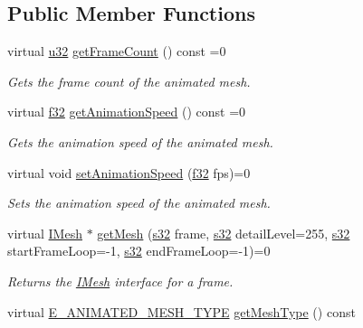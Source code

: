 \subsection*{Public Member Functions}
\begin{DoxyCompactItemize}
\item 
virtual \hyperlink{namespaceirr_a0416a53257075833e7002efd0a18e804}{u32} \hyperlink{classirr_1_1scene_1_1IAnimatedMesh_a2ec99aba081e9f37802e8ea9cd65629b}{get\+Frame\+Count} () const =0
\begin{DoxyCompactList}\small\item\em Gets the frame count of the animated mesh. \end{DoxyCompactList}\item 
virtual \hyperlink{namespaceirr_a0277be98d67dc26ff93b1a6a1d086b07}{f32} \hyperlink{classirr_1_1scene_1_1IAnimatedMesh_acb4249295319c8240d5bedc167417435}{get\+Animation\+Speed} () const =0
\begin{DoxyCompactList}\small\item\em Gets the animation speed of the animated mesh. \end{DoxyCompactList}\item 
virtual void \hyperlink{classirr_1_1scene_1_1IAnimatedMesh_a5eb1b09d96547dbd273d489e58d62658}{set\+Animation\+Speed} (\hyperlink{namespaceirr_a0277be98d67dc26ff93b1a6a1d086b07}{f32} fps)=0
\begin{DoxyCompactList}\small\item\em Sets the animation speed of the animated mesh. \end{DoxyCompactList}\item 
virtual \hyperlink{classirr_1_1scene_1_1IMesh}{I\+Mesh} $\ast$ \hyperlink{classirr_1_1scene_1_1IAnimatedMesh_adccb39fee83bed36a464cf7b96f3a0ca}{get\+Mesh} (\hyperlink{namespaceirr_ac66849b7a6ed16e30ebede579f9b47c6}{s32} frame, \hyperlink{namespaceirr_ac66849b7a6ed16e30ebede579f9b47c6}{s32} detail\+Level=255, \hyperlink{namespaceirr_ac66849b7a6ed16e30ebede579f9b47c6}{s32} start\+Frame\+Loop=-\/1, \hyperlink{namespaceirr_ac66849b7a6ed16e30ebede579f9b47c6}{s32} end\+Frame\+Loop=-\/1)=0
\begin{DoxyCompactList}\small\item\em Returns the \hyperlink{classirr_1_1scene_1_1IMesh}{I\+Mesh} interface for a frame. \end{DoxyCompactList}\item 
virtual \hyperlink{namespaceirr_1_1scene_a2fc85a64604521ca063f1881b5dd1c61}{E\+\_\+\+A\+N\+I\+M\+A\+T\+E\+D\+\_\+\+M\+E\+S\+H\+\_\+\+T\+Y\+PE} \hyperlink{classirr_1_1scene_1_1IAnimatedMesh_abe5a20eccfb94eefcc6cbbc0b667ce37}{get\+Mesh\+Type} () const

\end{DoxyCompactItemize}
